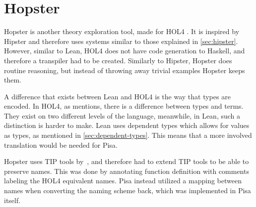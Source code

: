 \section{Hopster}\label{sec:hopster}
Hopster is another theory exploration tool, made for HOL4 \autocite{Hopster}.
It is inspired by Hipster and therefore uses systems similar to those explained in \cref{sec:hipster}.
However, similar to Lean, HOL4 does not have code generation to Haskell, and therefore a transpiler had to be created.
Similarly to Hipster, Hopster does routine reasoning, but instead of throwing away trivial examples Hopster keeps them.

A difference that exists between Lean and HOL4 is the way that types are encoded.
In HOL4, as \citeauthor{Hopster} mentions, there is a difference between types and terms.
They exist on two different levels of the language, meanwhile, in Lean, such a distinction is harder to make.
Lean uses dependent types which allows for values as types, as mentioned in \cref{sec:dependent-types}.
This means that a more involved translation would be needed for Pisa.

Hopster uses TIP tools by~\cite{TIP}, and therefore had to extend TIP tools to be able to preserve names.
This was done by annotating function definition with comments labeling the HOL4 equivalent names.
Pisa instead utilized a mapping between names when converting the naming scheme back, which was implemented in Pisa itself.
